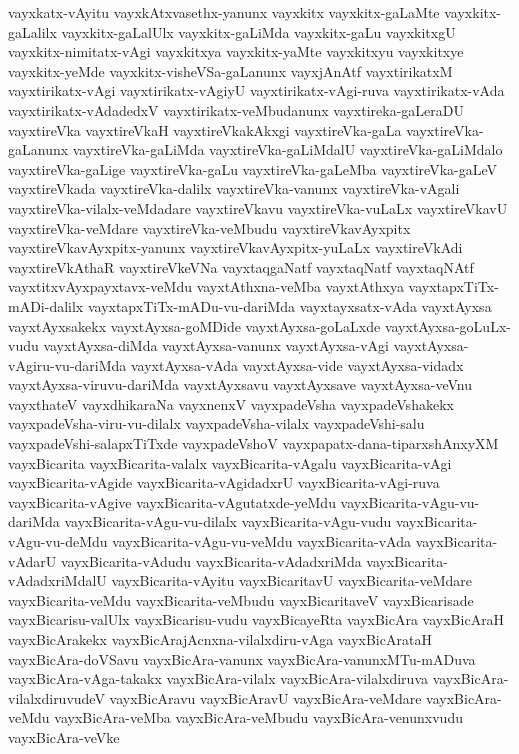 {vayxkatx-vAyitu
vayxkAtxvasethx-yanunx
vayxkitx
vayxkitx-gaLaMte
vayxkitx-gaLalilx
vayxkitx-gaLalUlx
vayxkitx-gaLiMda
vayxkitx-gaLu
vayxkitxgU
vayxkitx-nimitatx-vAgi
vayxkitxya
vayxkitx-yaMte
vayxkitxyu
vayxkitxye
vayxkitx-yeMde
vayxkitx-visheVSa-gaLanunx
vayxjAnAtf
vayxtirikatxM
vayxtirikatx-vAgi
vayxtirikatx-vAgiyU
vayxtirikatx-vAgi-ruva
vayxtirikatx-vAda
vayxtirikatx-vAdadedxV
vayxtirikatx-veMbudanunx
vayxtireka-gaLeraDU
vayxtireVka
vayxtireVkaH
vayxtireVkakAkxgi
vayxtireVka-gaLa
vayxtireVka-gaLanunx
vayxtireVka-gaLiMda
vayxtireVka-gaLiMdalU
vayxtireVka-gaLiMdalo
vayxtireVka-gaLige
vayxtireVka-gaLu
vayxtireVka-gaLeMba
vayxtireVka-gaLeV
vayxtireVkada
vayxtireVka-dalilx
vayxtireVka-vanunx
vayxtireVka-vAgali
vayxtireVka-vilalx-veMdadare
vayxtireVkavu
vayxtireVka-vuLaLx
vayxtireVkavU
vayxtireVka-veMdare
vayxtireVka-veMbudu
vayxtireVkavAyxpitx
vayxtireVkavAyxpitx-yanunx
vayxtireVkavAyxpitx-yuLaLx
vayxtireVkAdi
vayxtireVkAthaR
vayxtireVkeVNa
vayxtaqgaNatf
vayxtaqNatf
vayxtaqNAtf
vayxtitxvAyxpayxtavx-veMdu
vayxtAthxna-veMba
vayxtAthxya
vayxtapxTiTx-mADi-dalilx
vayxtapxTiTx-mADu-vu-dariMda
vayxtayxsatx-vAda
vayxtAyxsa
vayxtAyxsakekx
vayxtAyxsa-goMDide
vayxtAyxsa-goLaLxde
vayxtAyxsa-goLuLx-vudu
vayxtAyxsa-diMda
vayxtAyxsa-vanunx
vayxtAyxsa-vAgi
vayxtAyxsa-vAgiru-vu-dariMda
vayxtAyxsa-vAda
vayxtAyxsa-vide
vayxtAyxsa-vidadx
vayxtAyxsa-viruvu-dariMda
vayxtAyxsavu
vayxtAyxsave
vayxtAyxsa-veVnu
vayxthateV
vayxdhikaraNa
vayxnenxV
vayxpadeVsha
vayxpadeVshakekx
vayxpadeVsha-viru-vu-dilalx
vayxpadeVsha-vilalx
vayxpadeVshi-salu
vayxpadeVshi-salapxTiTxde
vayxpadeVshoV
vayxpapatx-dana-tiparxshAnxyXM
vayxBicarita
vayxBicarita-valalx
vayxBicarita-vAgalu
vayxBicarita-vAgi
vayxBicarita-vAgide
vayxBicarita-vAgidadxrU
vayxBicarita-vAgi-ruva
vayxBicarita-vAgive
vayxBicarita-vAgutatxde-yeMdu
vayxBicarita-vAgu-vu-dariMda
vayxBicarita-vAgu-vu-dilalx
vayxBicarita-vAgu-vudu
vayxBicarita-vAgu-vu-deMdu
vayxBicarita-vAgu-vu-veMdu
vayxBicarita-vAda
vayxBicarita-vAdarU
vayxBicarita-vAdudu
vayxBicarita-vAdadxriMda
vayxBicarita-vAdadxriMdalU
vayxBicarita-vAyitu
vayxBicaritavU
vayxBicarita-veMdare
vayxBicarita-veMdu
vayxBicarita-veMbudu
vayxBicaritaveV
vayxBicarisade
vayxBicarisu-valUlx
vayxBicarisu-vudu
vayxBicayeRta
vayxBicAra
vayxBicAraH
vayxBicArakekx
vayxBicArajAcnxna-vilalxdiru-vAga
vayxBicArataH
vayxBicAra-doVSavu
vayxBicAra-vanunx
vayxBicAra-vanunxMTu-mADuva
vayxBicAra-vAga-takakx
vayxBicAra-vilalx
vayxBicAra-vilalxdiruva
vayxBicAra-vilalxdiruvudeV
vayxBicAravu
vayxBicAravU
vayxBicAra-veMdare
vayxBicAra-veMdu
vayxBicAra-veMba
vayxBicAra-veMbudu
vayxBicAra-venunxvudu
vayxBicAra-veVke
}
